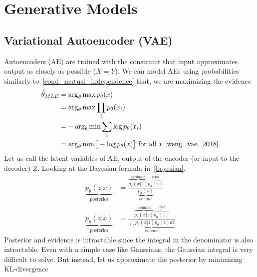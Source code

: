 \documentclass{article}
\numberwithin{equation}{subsection}
\begin{document}
\section{Generative Models}
\subsection{Variational Autoencoder (VAE)}
Autoencoders (AE) are trained with the constraint that input approximates output as closely as possible ($X=Y$). We can model AEs using probabilities similarly to~\ref{cond_mutual_independence} that, we are maximizing the evidence
\begin{align}
    \hat{\theta}_{MLE} &= \arg_\theta\max p_\theta(x)\\ 
    &= \arg_\theta\max\prod_i p_\theta(x_i)\\
    &= -\arg_\theta\min\sum_i \log p_\theta(x_i)\\
    &= \arg_\theta\min\big[-\log p_\theta(x)\big]\ \text{for all $x$}~\cite{weng_vae_2018}
\end{align}
Let us call the latent variables of AE, output of the encoder (or input to the decoder) $Z$. Looking at the Bayesian formula in~\ref{bayesian}, 
\begin{align}
    \underbrace{p_\theta(z|x)}_{\text{posterior}} &= \frac{\overbrace{p_\theta(x|z)}^\text{likelihood}\overbrace{p_\theta(z)}^\text{prior}}{\underbrace{p_\theta(x)}_\text{evidence}}\\
    \underbrace{p_\theta(z|x)}_{\text{posterior}} &= \frac{\overbrace{p_\theta(x|z)}^\text{likelihood}\overbrace{p_\theta(z)}^\text{prior}}{\underbrace{\int_z p_\theta(x|z)p_\theta(z)dz}_\text{evidence}}
\end{align}
Posterior and evidence is intractable since the integral in the denominator is also intractable. Even with a simple case like Gaussians, the Gaussian integral is very difficult to solve. But instead, let us approximate the posterior by minimizing KL-divergence
\end{document}
